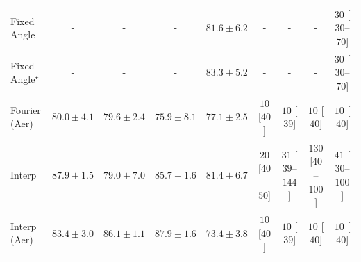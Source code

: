 \begin{tabular}{l|cccc|cccc|}
Fixed Angle & {\cellcolor[HTML]{000000}} \color[HTML]{F1F1F1} {\cellcolor{white}} \color{black} - & {\cellcolor[HTML]{000000}} \color[HTML]{F1F1F1} {\cellcolor{white}} \color{black} - & {\cellcolor[HTML]{000000}} \color[HTML]{F1F1F1} {\cellcolor{white}} \color{black} - & {\cellcolor[HTML]{F3801C}} \color[HTML]{F1F1F1} $81.6\pm 6.2$ & {\cellcolor[HTML]{000000}} \color[HTML]{F1F1F1} {\cellcolor{white}} \color{black} - & {\cellcolor[HTML]{000000}} \color[HTML]{F1F1F1} {\cellcolor{white}} \color{black} - & {\cellcolor[HTML]{000000}} \color[HTML]{F1F1F1} {\cellcolor{white}} \color{black} - & {\cellcolor[HTML]{FFF3EF}} \color[HTML]{000000} $30$ [$30$--$70$] \\
Fixed Angle$^\star$ & {\cellcolor[HTML]{000000}} \color[HTML]{F1F1F1} {\cellcolor{white}} \color{black} - & {\cellcolor[HTML]{000000}} \color[HTML]{F1F1F1} {\cellcolor{white}} \color{black} - & {\cellcolor[HTML]{000000}} \color[HTML]{F1F1F1} {\cellcolor{white}} \color{black} - & {\cellcolor[HTML]{E66A11}} \color[HTML]{F1F1F1} $83.3\pm 5.2$ & {\cellcolor[HTML]{000000}} \color[HTML]{F1F1F1} {\cellcolor{white}} \color{black} - & {\cellcolor[HTML]{000000}} \color[HTML]{F1F1F1} {\cellcolor{white}} \color{black} - & {\cellcolor[HTML]{000000}} \color[HTML]{F1F1F1} {\cellcolor{white}} \color{black} - & {\cellcolor[HTML]{FFF3EF}} \color[HTML]{000000} $30$ [$30$--$70$] \\
Fourier (Aer) & {\cellcolor[HTML]{FD9627}} \color[HTML]{000000} $80.0\pm 4.1$ & {\cellcolor[HTML]{FE9C2C}} \color[HTML]{000000} $79.6\pm 2.4$ & {\cellcolor[HTML]{FECE65}} \color[HTML]{000000} $75.9\pm 8.1$ & {\cellcolor[HTML]{FEC14C}} \color[HTML]{000000} $77.1\pm 2.5$ & {\cellcolor[HTML]{FFF7F3}} \color[HTML]{000000} $10$ [$40$] & {\cellcolor[HTML]{FFF7F3}} \color[HTML]{000000} $10$ [$39$] & {\cellcolor[HTML]{FFF7F3}} \color[HTML]{000000} $10$ [$40$] & {\cellcolor[HTML]{FFF7F3}} \color[HTML]{000000} $10$ [$40$] \\
Interp & {\cellcolor[HTML]{A63A03}} \color[HTML]{F1F1F1} $87.9\pm 1.5$ & {\cellcolor[HTML]{FEA433}} \color[HTML]{000000} $79.0\pm 7.0$ & {\cellcolor[HTML]{CB4B02}} \color[HTML]{F1F1F1} $85.7\pm 1.6$ & {\cellcolor[HTML]{F4821D}} \color[HTML]{F1F1F1} $81.4\pm 6.7$ & {\cellcolor[HTML]{FFF5F1}} \color[HTML]{000000} $20$ [$40$--$50$] & {\cellcolor[HTML]{FFF3EF}} \color[HTML]{000000} $31$ [$39$--$144$] & {\cellcolor[HTML]{FDDBD7}} \color[HTML]{000000} $130$ [$40$--$100$] & {\cellcolor[HTML]{FEF0EC}} \color[HTML]{000000} $41$ [$30$--$100$] \\
Interp (Aer) & {\cellcolor[HTML]{E46710}} \color[HTML]{F1F1F1} $83.4\pm 3.0$ & {\cellcolor[HTML]{C44802}} \color[HTML]{F1F1F1} $86.1\pm 1.1$ & {\cellcolor[HTML]{A63A03}} \color[HTML]{F1F1F1} $87.9\pm 1.6$ & {\cellcolor[HTML]{FEE799}} \color[HTML]{000000} $73.4\pm 3.8$ & {\cellcolor[HTML]{FFF7F3}} \color[HTML]{000000} $10$ [$40$] & {\cellcolor[HTML]{FFF7F3}} \color[HTML]{000000} $10$ [$39$] & {\cellcolor[HTML]{FFF7F3}} \color[HTML]{000000} $10$ [$40$] & {\cellcolor[HTML]{FFF7F3}} \color[HTML]{000000} $10$ [$40$] \\

\end{tabular}
